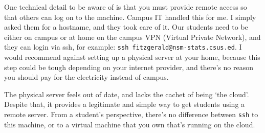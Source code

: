 \documentclass{article}
\begin{document}
One technical detail to be aware of is that you must provide remote access so that others can log on to the machine.
Campus IT handled this for me.
I simply asked them for a hostname, and they took care of it.
Our students need to be either on campus or at home on the campus VPN (Virtual Private Network), and they can login via ssh, for example: \texttt{ssh fitzgerald@nsm-stats.csus.ed}.
I would recommend against setting up a physical server at your home, because this step could be tough depending on your internet provider, and there's no reason you should pay for the electricity instead of campus.

The physical server feels out of date, and lacks the cachet of being `the cloud'.
Despite that, it provides a legitimate and simple way to get students using a remote server.
From a student's perspective, there's no difference between \texttt{ssh} to this machine, or to a virtual machine that you own that's running on the cloud.
\end{document}
